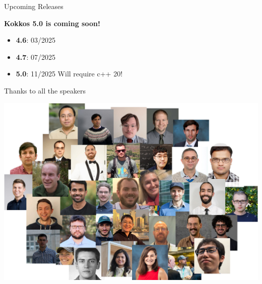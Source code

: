\begin{frame}[fragile]{Upcoming Releases}
  \begin{center}
\textbf{Kokkos 5.0 is coming soon!}
\vspace{1cm}
  \begin{itemize}
    \item{\textbf{4.6}: 03/2025}
    \item{\textbf{4.7}: \textcolor{black!40!white}{07/2025}}
    \item{\textbf{5.0}: \textcolor{black!40!white}{11/2025} Will require c++ 20!}
  \end{itemize}
  \end{center}
\end{frame}

\begin{frame}[fragile]{Thanks to all the speakers}

  \begin{center}
  \includegraphics[height=0.8\textheight]{mosaic.jpg}
  \end{center}

\end{frame}
